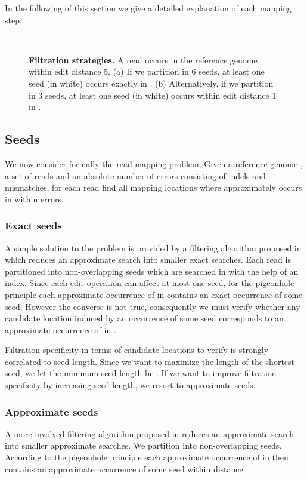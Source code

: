 \documentclass[a4,center,fleqn]{article}
\begin{document}
In the following of this section we give a detailed explanation of each mapping step.

\begin{figure}[h]
\centering
{}
\\
\vspace{5mm}
\caption{
{\bfseries Filtration strategies.}
A read  occurs in the reference genome  within edit distance 5.
(a) If we partition  in 6 seeds, at least one seed (in white) occurs exactly in .
(b) Alternatively, if we partition  in 3 seeds, at least one seed (in white) occurs within edit distance 1 in .
}
\label{fig:FiltrationStrategies}
\end{figure}


\subsection{Seeds}
We now consider formally the read mapping problem.
Given a reference genome , a set of reads  and an absolute number of errors  consisting of indels and mismatches, for each read  find all mapping locations where  approximately occurs in  within  errors.

\subsubsection{Exact seeds}
A simple solution to the problem is provided by a filtering algorithm proposed in \cite{Baeza1999b} which reduces an approximate search into smaller exact searches.
Each read  \textcolor{black}{is} partitioned into  non-overlapping seeds which \textcolor{black}{are} searched in  with the help of an index.
Since each edit operation can affect at most one seed, for the pigeonhole principle each approximate occurrence of  in  contains an exact occurrence of some seed.
However the converse is not true, consequently we must verify whether any candidate location induced by an occurrence of some seed corresponds to an approximate occurrence of  in .

Filtration specificity in terms of candidate locations to verify is strongly correlated to seed length.
Since we want to maximize the length of the shortest seed, we let the minimum seed length be .
If we want to improve filtration specificity by increasing seed length, we resort to approximate seeds.

\subsubsection{Approximate seeds}
A more involved filtering algorithm proposed in \cite{Navarro2000} reduces an approximate search into smaller approximate searches.
We partition  into  non-overlapping seeds.
According to the pigeonhole principle each approximate occurrence of  in  then contains an approximate occurrence of some seed within distance .
\end{document}
